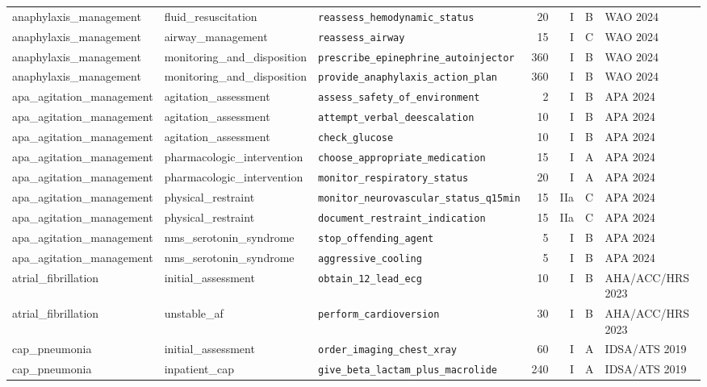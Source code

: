 \begin{longtable}{lllrrll}
anaphylaxis\_management & fluid\_resuscitation & \texttt{reassess\_hemodynamic\_status} & 20 & I & B & WAO 2024 \\
anaphylaxis\_management & airway\_management & \texttt{reassess\_airway} & 15 & I & C & WAO 2024 \\
anaphylaxis\_management & monitoring\_and\_disposition & \texttt{prescribe\_epinephrine\_autoinjector} & 360 & I & B & WAO 2024 \\
anaphylaxis\_management & monitoring\_and\_disposition & \texttt{provide\_anaphylaxis\_action\_plan} & 360 & I & B & WAO 2024 \\
apa\_agitation\_management & agitation\_assessment & \texttt{assess\_safety\_of\_environment} & 2 & I & B & APA 2024 \\
apa\_agitation\_management & agitation\_assessment & \texttt{attempt\_verbal\_deescalation} & 10 & I & B & APA 2024 \\
apa\_agitation\_management & agitation\_assessment & \texttt{check\_glucose} & 10 & I & B & APA 2024 \\
apa\_agitation\_management & pharmacologic\_intervention & \texttt{choose\_appropriate\_medication} & 15 & I & A & APA 2024 \\
apa\_agitation\_management & pharmacologic\_intervention & \texttt{monitor\_respiratory\_status} & 20 & I & A & APA 2024 \\
apa\_agitation\_management & physical\_restraint & \texttt{monitor\_neurovascular\_status\_q15min} & 15 & IIa & C & APA 2024 \\
apa\_agitation\_management & physical\_restraint & \texttt{document\_restraint\_indication} & 15 & IIa & C & APA 2024 \\
apa\_agitation\_management & nms\_serotonin\_syndrome & \texttt{stop\_offending\_agent} & 5 & I & B & APA 2024 \\
apa\_agitation\_management & nms\_serotonin\_syndrome & \texttt{aggressive\_cooling} & 5 & I & B & APA 2024 \\
atrial\_fibrillation & initial\_assessment & \texttt{obtain\_12\_lead\_ecg} & 10 & I & B & AHA/ACC/HRS 2023 \\
atrial\_fibrillation & unstable\_af & \texttt{perform\_cardioversion} & 30 & I & B & AHA/ACC/HRS 2023 \\
cap\_pneumonia & initial\_assessment & \texttt{order\_imaging\_chest\_xray} & 60 & I & A & IDSA/ATS 2019 \\
cap\_pneumonia & inpatient\_cap & \texttt{give\_beta\_lactam\_plus\_macrolide} & 240 & I & A & IDSA/ATS 2019 \\

\end{longtable}
